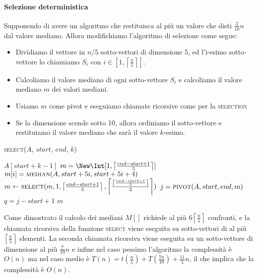         \paragraph{Selezione deterministica}    
            Supponendo di avere un algoritmo che restituisca al più un valore che disti $\frac{3}{10}n$ dal valore mediano. Allora modifichiamo l'algoritmo di selezione come segue:
            \begin{itemize}
                \item Dividiamo il vettore in $n/5$ sotto-vettori di dimensione 5, ed l'i-esimo sotto-vettore lo chiamiamo $S_i$ con $i\in[1,\left\lceil\frac{n}{5}\right\rceil]$.
                \item Calcoliamo il valore mediano di ogni sotto-vettore $S_i$ e calcoliamo il valore mediano $m$ dei valori mediani.
                \item Usiamo $m$ come pivot e eseguiamo chiamate ricorsive come per la \textsc{selection}
                \item Se la dimensione scende sotto 10, allora ordiniamo il sotto-vettore e restituiamo il valore mediano che sarà il valore $k$-esimo.
            \end{itemize}
            \begin{algorithm}[H]
                \caption{\Item \textsc{select}(\Item[] $A$, \Int $start$, \Int $end$, \Int $k$)}
                \begin{algorithmic}
                        \State {}
                        \State \Return $A[start + k - 1]$
                    \EndIf
                    \State $m = \New\Int[1,\left\lceil\frac{end-start+1}{5}\right\rceil]$
                        \State $m[i] = \Call{median}{A, start + 5i, start + 5i + 4}$
                    \EndFor
                    \State \Item $ m \gets \Call{select}{m, 1, \left\lceil\frac{end-start+1}{5}\right\rceil, \left\lceil\frac{\left\lceil\frac{end-start+1}{5}\right\rceil}{2}\right\rceil}$
                    \State \Int $j = \Call{pivot}{A, start, end, m}$
                    \State \Int $q = j - start + 1$
                        \State \Return $m$
                        \State \Return {}
                    \Else
                        \State \Return {}
                    \EndIf
                \end{algorithmic}
            \end{algorithm}
            Come dimostrato il calcolo dei mediani $M[]$ richiede al più $6\left\lceil\frac{n}{5}\right\rceil$ confronti, e la chiamata ricorsiva della funzione \textsc{select} viene eseguita su sotto-vettori di al più $\left\lceil\frac{n}{5}\right\rceil$ elementi. La seconda chiamata ricorsiva viene eseguita su un sotto-vettore di dimensione al più $\frac{7}{10}n$ e infine nel caso pessimo l'algoritmo la complessità è $O(n)$ ma nel caso medio è $T(n)=t(\frac{n}{5})+T(\frac{7n}{10})+\frac{11}{5}n$, il che implica che la complessità è $O(n)$.